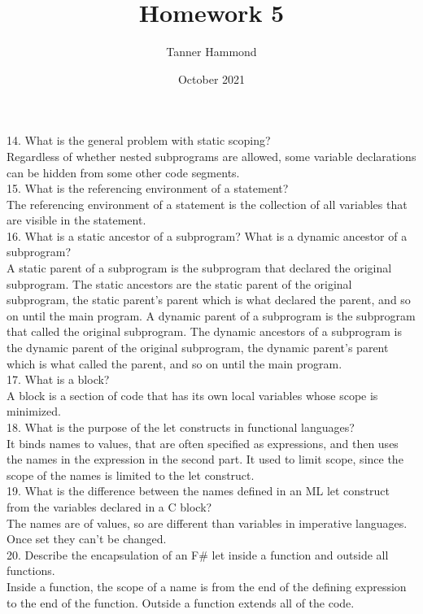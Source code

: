 \documentclass{article}
\title{Homework 5}
\author{Tanner Hammond}
\date{October 2021}
\begin{document}
\maketitle

14. What is the general problem with static scoping?\\
Regardless of whether nested subprograms are allowed, some variable declarations can be hidden from some other code segments. \\
15. What is the referencing environment of a statement?\\
The referencing environment of a statement is the collection of all variables that are visible in the statement.\\
16. What is a static ancestor of a subprogram? What is a dynamic ancestor of a subprogram?\\
A static parent of a subprogram is the subprogram that declared the original subprogram. The static ancestors are the static parent of the original subprogram, the static parent's parent which is what declared the parent, and so on until the main program. A dynamic parent of a subprogram is the subprogram that called the original subprogram. The dynamic ancestors of a subprogram is the dynamic parent of the original subprogram, the dynamic parent's parent which is what called the parent, and so on until the main program. \\
17. What is a block?\\
A block is a section of code that has its own local variables whose scope is minimized.\\
18. What is the purpose of the let constructs in functional languages?\\
It binds names to values, that are often specified as expressions, and then uses the names in the expression in the second part. It used to limit scope, since the scope of the names is limited to the let construct.\\
19. What is the difference between the names defined in an ML let construct from the variables declared in a C block?\\
The names are of values, so are different than variables in imperative languages. Once set they can't be changed.\\
20. Describe the encapsulation of an F# let inside a function and outside all functions.\\
Inside a function, the scope of a name is from the end of the defining expression to the end of the function. Outside a function extends all of the code.\\
\end{document}
